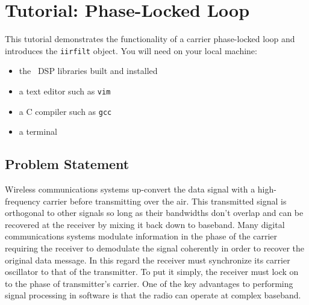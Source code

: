 % 
%

\newpage
\section{Tutorial: Phase-Locked Loop}
\label{tutorial:pll}
This tutorial demonstrates the functionality of a carrier phase-locked
loop and introduces the {\tt iirfilt} object.
%
You will need on your local machine:
\begin{itemize}
\item the \liquid\ DSP libraries built and installed
\item a text editor such as {\tt vim} \cite{vim:web}
\item a C compiler such as {\tt gcc} \cite{gcc:web}
\item a terminal
\end{itemize}

\subsection{Problem Statement}
\label{tutorial:pll:problem}
Wireless communications systems up-convert the data signal with
a high-frequency carrier before transmitting over the air.
This transmitted signal is orthogonal to other signals so long as
their bandwidths don't overlap and can be recovered at the receiver by
mixing it back down to baseband.
Many digital communications systems modulate information in the phase of
the carrier requiring the receiver to demodulate the signal coherently
in order to recover the original data message.
In this regard the receiver must synchronize its carrier oscillator to
that of the transmitter.
To put it simply, the receiver must lock on to the phase of
transmitter's carrier.
One of the key advantages to performing signal processing in software is
that the radio can operate at complex baseband.

